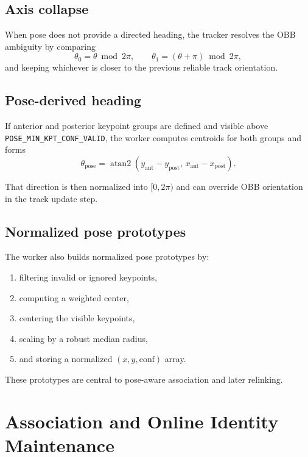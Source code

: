 \documentclass[11pt]{article}
\newcommand{\runtimekey}[1]{\texttt{#1}}
\begin{document}
\subsection{Axis collapse}

When pose does not provide a directed heading, the tracker resolves the OBB ambiguity by comparing
\begin{equation}
  \theta_0 = \theta \bmod 2\pi,
  \qquad
  \theta_1 = (\theta + \pi) \bmod 2\pi,
\end{equation}
and keeping whichever is closer to the previous reliable track orientation.

\subsection{Pose-derived heading}

If anterior and posterior keypoint groups are defined and visible above \runtimekey{POSE\_MIN\_KPT\_CONF\_VALID}, the worker computes centroids for both groups and forms
\begin{equation}
  \theta_{\text{pose}} = \operatorname{atan2}(y_{\text{ant}} - y_{\text{post}},\,
  x_{\text{ant}} - x_{\text{post}}).
\end{equation}

That direction is then normalized into $[0,2\pi)$ and can override OBB orientation in the track update step.

\subsection{Normalized pose prototypes}

The worker also builds normalized pose prototypes by:

\begin{enumerate}
  \item filtering invalid or ignored keypoints,
  \item computing a weighted center,
  \item centering the visible keypoints,
  \item scaling by a robust median radius,
  \item and storing a normalized $\left(x,y,\text{conf}\right)$ array.
\end{enumerate}

These prototypes are central to pose-aware association and later relinking.

\section{Association and Online Identity Maintenance}
\end{document}
